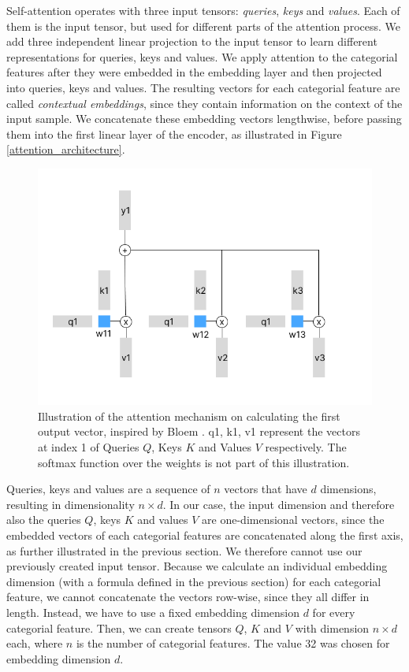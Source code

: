 Self-attention operates with three input tensors: \textit{queries}, \textit{keys} and \textit{values}. Each of them is the input tensor, but used for different parts of the attention process. We add three independent linear projection to the input tensor to learn different representations for queries, keys and values. We apply attention to the categorial features after they were embedded in the embedding layer and then projected into queries, keys and values. The resulting vectors for each categorial feature are called \textit{contextual embeddings}, since they contain information on the context of the input sample. We concatenate these embedding vectors lengthwise, before passing them into the first linear layer of the encoder, as illustrated in Figure \ref{attention_architecture}.

\begin{figure}
	\includegraphics[width=1.1\linewidth]{attention_illustrated.png}
	\caption{Illustration of the attention mechanism on calculating the first output vector, inspired by Bloem \cite{transformers_from_scratch}. q1, k1, v1 represent the vectors at index 1 of Queries $Q$, Keys $K$ and Values $V$ respectively. The softmax function over the weights is not part of this illustration.}
	\label{attention_illustrated}
\end{figure}

Queries, keys and values are a sequence of $n$ vectors that have $d$ dimensions, resulting in dimensionality $n \times d$. In our case, the input dimension and therefore also the queries $Q$, keys $K$ and values $V$ are one-dimensional vectors, since the embedded vectors of each categorial features are concatenated along the first axis, as further illustrated in the previous section. We therefore cannot use our previously created input tensor. Because we calculate an individual embedding dimension (with a formula defined in the previous section) for each categorial feature, we cannot concatenate the vectors row-wise, since they all differ in length. Instead, we have to use a fixed embedding dimension $d$ for every categorial feature. Then, we can create tensors $Q$, $K$ and $V$ with dimension $n \times d$ each, where $n$ is the number of categorial features. The value 32 was chosen for embedding dimension $d$.

